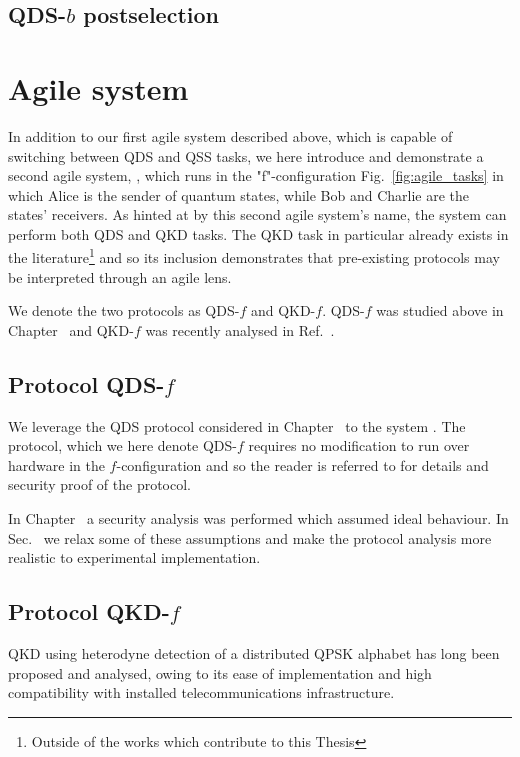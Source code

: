 \subsection{QDS-$b$ postselection}

\section{Agile system \systemF}

In addition to our first agile system described above, which is capable of switching between QDS and QSS tasks, we here introduce and demonstrate a second agile system, \systemF, which runs in the "f"-configuration Fig.~\ref{fig:agile_tasks} in which Alice is the sender of quantum states, while Bob and Charlie are the states' receivers. As hinted at by this second agile system's name, the system can perform both QDS and QKD tasks. The QKD task in particular already exists in the literature\footnote{Outside of the works which contribute to this Thesis} and so its inclusion demonstrates that pre-existing protocols may be interpreted through an agile lens.

We denote the two protocols as QDS-$f$ and QKD-$f$. QDS-$f$ was studied above in Chapter~ and QKD-$f$ was recently analysed in Ref.~\cite{Papanastasiou2018}.


\subsection{Protocol QDS-$f$}
We leverage the QDS protocol considered in Chapter~ to the system \systemF. The protocol, which we here denote QDS-$f$ requires no modification to run over hardware in the $f$-configuration and so the reader is referred to  for details and security proof of the protocol. 

In Chapter~ a security analysis was performed which assumed ideal behaviour. In Sec.~ we relax some of these assumptions and make the protocol analysis more realistic to experimental implementation.

\subsection{Protocol QKD-$f$}
QKD using heterodyne detection of a distributed QPSK alphabet has long been proposed and analysed, owing to its ease of implementation and high compatibility with installed telecommunications infrastructure. 

